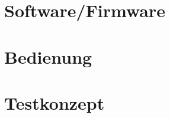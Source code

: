 \documentclass{fhnwreport/fhnwreport}
\begin{document}
\clearpage
\section{Software/Firmware}
\label{sec:software}


\section{Bedienung}
\label{sec:bedienung}


\clearpage
\section{Testkonzept}
\label{sec:testkonzept}


%



%
\end{document}
